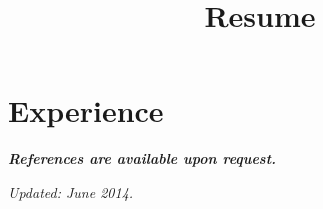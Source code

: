 \documentclass[12pt,a4paper]{moderncv}
\title{Resume}
\begin{document}
\maketitle











\newpage




\section{Experience}









\emph{\textbf{References are available upon request.}}

\vspace{0.5cm}
\emph{Updated: June 2014.}
\end{document}
